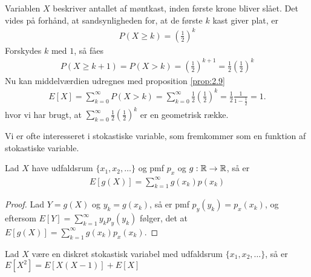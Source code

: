\begin{exmp}
    Variablen $X$ beskriver antallet af møntkast, inden første krone bliver slået. Det vides på forhånd, at sandsynligheden for, at de første $k$ kast giver plat, er 
    \begin{align*}
        P(X\geq k)=\left(\frac{1}{2}\right)^k
    \end{align*}
    Forskydes $k$ med $1$, så fåes
    \begin{align*}
        P(X\geq k+1)=P(X>k)=\left(\frac{1}{2}\right)^{k+1}=\frac{1}{2}\left(\frac{1}{2}\right)^k
    \end{align*}
    Nu kan middelværdien udregnes med proposition \ref{prop:2.9}
    \begin{align*}
        E[X]=\sum_{k=0}^\infty P(X>k)=\sum_{k=0}^\infty\frac{1}{2}\left(\frac{1}{2}\right)^k=\frac{1}{2}\frac{1}{1-\frac{1}{2}}=1.
    \end{align*}
    hvor vi har brugt, at $\sum_{k=0}^\infty\frac{1}{2}\left(\frac{1}{2}\right)^k$ er en geometrisk række.
\end{exmp}
Vi er ofte interesseret i stokastiske variable, som fremkommer som en funktion af stokastiske variable.

\begin{prop} \label{prop 2.12} %
Lad $X$ have udfaldsrum $\{x_1,x_2,\ldots\}$ og pmf $p_x$ og $g:\mathbb{R}\to \mathbb{R}$, så er
\begin{align*}
    E[g(X)] = \sum_{k=1}^\infty g(x_k)p(x_k)
\end{align*}
\end{prop}
\begin{proof}
Lad $Y = g(X)$ og $y_k = g(x_k)$, så er pmf $p_y(y_k) = p_x(x_k)$, og eftersom 
$E[Y] = \sum^\infty_{k = 1} y_k p_y(y_k)$
følger, det at $E[g(X)] = \sum^\infty_{k = 1} g(x_k) p_x(x_k)$.
\end{proof}

\begin{lem} \label{lem:middelværdiAfX2}
Lad $X$ være en diskret stokastisk variabel med udfaldsrum $\{x_1, x_2, \ldots\}$, så er $E[X^2] = E[X(X-1)] + E[X]$
\end{lem}


